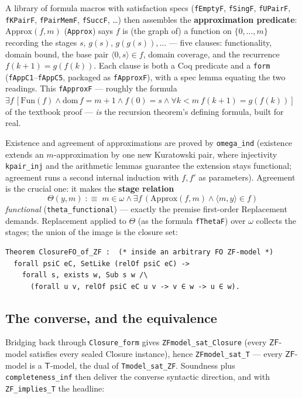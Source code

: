 \documentclass[11pt]{article}
\theoremstyle{plain}
\theoremstyle{definition}
\newcommand{\ZF}{\mathsf{ZF}}
\renewcommand{\ZF}{\textsf{ZF}}
\newcommand{\T}{\textsf{T}}
\newcommand{\cq}[1]{\lstinline[basicstyle=\ttfamily]|#1|}
\begin{document}
A library of formula macros with satisfaction specs (\cq{fEmptyF}, \cq{fSingF},
\cq{fUPairF}, \cq{fKPairF}, \cq{fPairMemF}, \cq{fSuccF}, \dots) then assembles
the \textbf{approximation predicate}: $\mathrm{Approx}(f,m)$ (\cq{Approx}) says
$f$ is (the graph of) a function on $\{0,\dots,m\}$ recording the stages
$s,\,g(s),\,g(g(s)),\dots$ --- five clauses: functionality, domain bound, the
base pair $\langle 0,s\rangle \in f$, domain coverage, and the recurrence
$f(k{+}1) = g(f(k))$. Each clause is both a Coq predicate and a \cq{form}
(\cq{fAppC1}--\cq{fAppC5}, packaged as \cq{fApproxF}), with a spec lemma
equating the two readings. This \cq{fApproxF} --- roughly the formula
$\exists f\,[\mathrm{Fun}(f) \wedge \mathrm{dom}\,f = m{+}1 \wedge f(0)=s
\wedge \forall k{<}m\ f(k{+}1)=g(f(k))]$ of the textbook proof --- \emph{is}
the recursion theorem's defining formula, built for real.

Existence and agreement of approximations are proved by \cq{omega_ind}
(existence extends an $m$-approximation by one new Kuratowski pair, where
injectivity \cq{kpair_inj} and the arithmetic lemmas guarantee the extension
stays functional; agreement runs a second internal induction with $f, f'$ as
parameters). Agreement is the crucial one: it makes the \textbf{stage relation}
\[
  \Theta(y,m) \;:\equiv\; m \in \omega \wedge \exists f\,
  (\mathrm{Approx}(f,m) \wedge \langle m,y\rangle \in f)
\]
\emph{functional} (\cq{theta_functional}) --- exactly the premise first-order
Replacement demands. Replacement applied to $\Theta$ (as the formula
\cq{fThetaF}) over $\omega$ collects the stages; the union of the image is the
closure set:

\begin{lstlisting}
Theorem ClosureFO_of_ZF :  (* inside an arbitrary FO ZF-model *)
  forall psiC eC, SetLike (relOf psiC eC) ->
    forall s, exists w, Sub s w /\
      (forall u v, relOf psiC eC u v -> v ∈ w -> u ∈ w).
\end{lstlisting}

\subsection{The converse, and the equivalence}

Bridging back through \cq{Closure_form} gives \cq{ZFmodel_sat_Closure} (every
$\ZF$-model satisfies every sealed Closure instance), hence
\cq{ZFmodel_sat_T} --- every $\ZF$-model is a $\T$-model, the dual of
\cq{Tmodel_sat_ZF}. Soundness plus \cq{completeness_inf} then deliver the
converse syntactic direction, and with \cq{ZF_implies_T} the headline:
\end{document}
